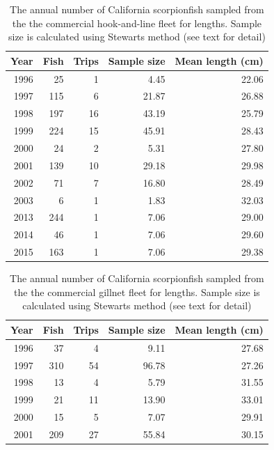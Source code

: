 \documentclass[12pt,]{article}
\begin{document}
\begin{table}[ht]
\centering
\caption{The annual number of California scorpionfish 
                                              sampled from the the commercial hook-and-line 
                                            fleet for lengths. Sample size is calculated 
                                            using Stewarts method (see text for detail)} 
\label{tab:ComHL_lengthsample}
\begin{tabular}{rrrrr}
  \hline
Year & Fish & Trips & Sample size & Mean length (cm) \\ 
  \hline
1996 &  25 &   1 & 4.45 & 22.06 \\ 
  1997 & 115 &   6 & 21.87 & 26.88 \\ 
  1998 & 197 &  16 & 43.19 & 25.79 \\ 
  1999 & 224 &  15 & 45.91 & 28.43 \\ 
  2000 &  24 &   2 & 5.31 & 27.80 \\ 
  2001 & 139 &  10 & 29.18 & 29.98 \\ 
  2002 &  71 &   7 & 16.80 & 28.49 \\ 
  2003 &   6 &   1 & 1.83 & 32.03 \\ 
  2013 & 244 &   1 & 7.06 & 29.00 \\ 
  2014 &  46 &   1 & 7.06 & 29.60 \\ 
  2015 & 163 &   1 & 7.06 & 29.38 \\ 
   \hline
\end{tabular}
\end{table}\begin{table}[ht]
\centering
\caption{The annual number of California scorpionfish 
                                              sampled from the the commercial gillnet 
                                            fleet for lengths. Sample size is calculated 
                                            using Stewarts method (see text for detail)} 
\label{tab:ComNet_lengthsample}
\begin{tabular}{rrrrr}
  \hline
Year & Fish & Trips & Sample size & Mean length (cm) \\ 
  \hline
1996 &  37 &   4 & 9.11 & 27.68 \\ 
  1997 & 310 &  54 & 96.78 & 27.26 \\ 
  1998 &  13 &   4 & 5.79 & 31.55 \\ 
  1999 &  21 &  11 & 13.90 & 33.01 \\ 
  2000 &  15 &   5 & 7.07 & 29.91 \\ 
  2001 & 209 &  27 & 55.84 & 30.15 \\ 

\end{tabular}
\end{table}
\end{document}
